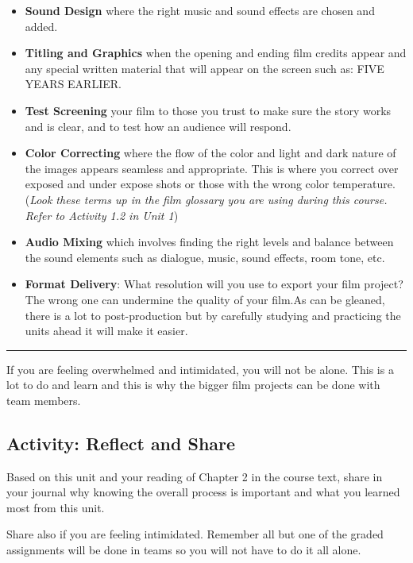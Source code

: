 \documentclass[
]{book}
\begin{document}
\begin{itemize}
\item
  \textbf{Sound Design} where the right music and sound effects are chosen and added.
\item
  \textbf{Titling and Graphics} when the opening and ending film credits appear and any special written material that will appear on the screen such as: FIVE YEARS EARLIER.
\item
  \textbf{Test Screening} your film to those you trust to make sure the story works and is clear, and to test how an audience will respond.
\item
  \textbf{Color Correcting} where the flow of the color and light and dark nature of the images appears seamless and appropriate. This is where you correct over exposed and under expose shots or those with the wrong color temperature. (\emph{Look these terms up in the film glossary you are using during this course. Refer to Activity 1.2 in Unit 1})
\item
  \textbf{Audio Mixing} which involves finding the right levels and balance between the sound elements such as dialogue, music, sound effects, room tone, etc.
\item
  \textbf{Format Delivery}: What resolution will you use to export your film project? The wrong one can undermine the quality of your film.As can be gleaned, there is a lot to post-production but by carefully studying and practicing the units ahead it will make it easier.
\end{itemize}

\begin{center}\rule{0.5\linewidth}{0.5pt}\end{center}

If you are feeling overwhelmed and intimidated, you will not be alone. This is a lot to do and learn and this is why the bigger film projects can be done with team members.

\hypertarget{activity-reflect-and-share}{%
\subsection*{Activity: Reflect and Share}\label{activity-reflect-and-share}}

\begin{reflect}
Based on this unit and your reading of Chapter 2 in the course text, share in your journal why knowing the overall process is important and what you learned most from this unit.

Share also if you are feeling intimidated. Remember all but one of the graded assignments will be done in teams so you will not have to do it all alone.
\end{reflect}
\end{document}
